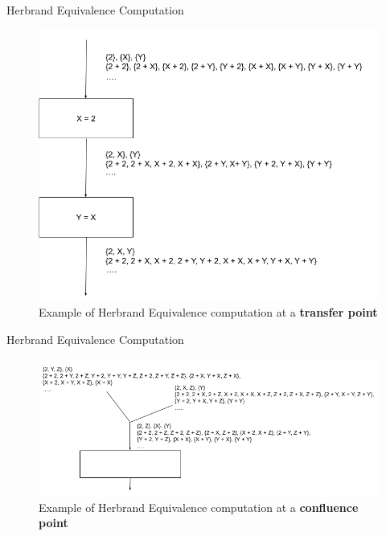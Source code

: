 \documentclass[11pt]{beamer}
\begin{document}
\begin{frame}{Herbrand Equivalence Computation}
    \begin{figure}[!h]
        \centering
        \includegraphics[scale=0.3]{HerbrandEquivalenceTrans.png}
        \caption{Example of Herbrand Equivalence computation at a \textbf{transfer point}}
        \label{fig:HerbrandEquivalenceTrans}
    \end{figure}
\end{frame}

\begin{frame}{Herbrand Equivalence Computation}
    \begin{figure}[!h]
        \centering
        \includegraphics[scale=0.35]{HerbrandEquivalenceConv.png}
        \caption{Example of Herbrand Equivalence computation at a \textbf{confluence point}}
        \label{fig:HerbrandEquivalenceConv}
    \end{figure}
\end{frame}
\end{document}
